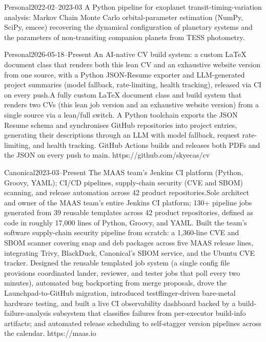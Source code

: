 {Personal}{2022-02--2023-03}
{A Python pipeline for exoplanet transit-timing-variation analysis: Markov Chain Monte Carlo orbital-parameter estimation (NumPy, SciPy, emcee) recovering the dynamical configuration of planetary systems and the parameters of non-transiting companion planets from TESS photometry.}
{}
\fi

{Personal}{2026-05-18--Present}
{\iflean An AI-native CV build system: a custom LaTeX document class that renders both this lean CV and an exhaustive website version from one source, with a Python JSON-Resume exporter and LLM-generated project summaries (model fallback, rate-limiting, health tracking), released via CI on every push.\else A fully custom LaTeX document class and build system that renders two CVs (this lean job version and an exhaustive website version) from a single source via a lean/full switch. A Python toolchain exports the JSON Resume schema and synchronises GitHub repositories into project entries, generating their descriptions through an LLM with model fallback, request rate-limiting, and health tracking. GitHub Actions builds and releases both PDFs and the JSON on every push to main.\fi}
{https://github.com/skyecas/cv}

{Canonical}{2023-03--Present}
{\iflean The MAAS team's Jenkins CI platform (Python, Groovy, YAML); CI/CD pipelines, supply-chain security (CVE and SBOM) scanning, and release automation across 42 product repositories.\else Sole architect and owner of the MAAS team's entire Jenkins CI platform; 130+ pipeline jobs generated from 39 reusable templates across 42 product repositories, defined as code in roughly 17,000 lines of Python, Groovy, and YAML. Built the team's software supply-chain security pipeline from scratch: a 1,360-line CVE and SBOM scanner covering snap and deb packages across five MAAS release lines, integrating Trivy, BlackDuck, Canonical's SBOM service, and the Ubuntu CVE tracker. Designed the reusable templated job system (a single config file provisions coordinated lander, reviewer, and tester jobs that poll every two minutes), automated bug backporting from merge proposals, drove the Launchpad-to-GitHub migration, introduced testflinger-driven bare-metal hardware testing, and built a live CI observability dashboard backed by a build-failure-analysis subsystem that classifies failures from per-executor build-info artifacts; and automated release scheduling to self-stagger version pipelines across the calendar.\fi}
{https://maas.io}

